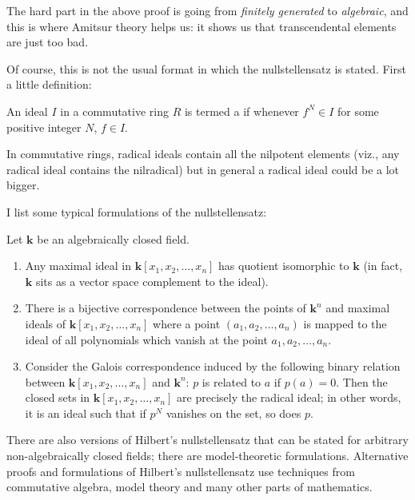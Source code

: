 \documentclass[a4paper]{amsart}
\newcommand{\field}{\mathbf{k}}
\begin{document}
The hard part in the above proof is going from {\em finitely
  generated} to {\em algebraic}, and this is where Amitsur theory
helps us: it shows us that transcendental elements are just too bad.

Of course, this is not the usual format in which the nullstellensatz
is stated. First a little definition:

\begin{definer}
  An ideal $I$ in a commutative ring $R$ is termed a
   if whenever $f^N \in I$ for some
  positive integer $N$, $f \in I$.
\end{definer}

In commutative rings, radical ideals contain all the nilpotent
elements (viz., any radical ideal contains the nilradical) but in
general a radical ideal could be a lot bigger.

I list some typical formulations of the nullstellensatz:

\begin{theorem}
  Let $\field$ be an algebraically closed field.

  \begin{enumerate}

  \item Any maximal ideal in $\field[x_1,x_2,\ldots,x_n]$ has quotient
    isomorphic to $\field$ (in fact, $\field$ sits as a vector space
    complement to the ideal).

  \item There is a bijective correspondence between the points of
    $\field^n$ and maximal ideals of $\field[x_1,x_2,\ldots,x_n]$
    where a point $(a_1,a_2,\ldots,a_n)$ is mapped to the ideal of all
    polynomials which vanish at the point $a_1, a_2, \ldots, a_n$.

  \item Consider the Galois correspondence induced by the following
    binary relation between $\field[x_1, x_2, \ldots, x_n]$ and
    $\field^n$: $p$ is related to $a$ if $p(a) = 0$. Then the closed
    sets in $\field[x_1,x_2,\ldots,x_n]$ are precisely the radical
    ideal; in other words, it is an ideal such that if $p^N$ vanishes
    on the set, so does $p$.

  \end{enumerate}
\end{theorem}

There are also versions of Hilbert's nullstellensatz that can be
stated for arbitrary non-algebraically closed fields; there are
model-theoretic formulations. Alternative proofs and formulations of
Hilbert's nullstellensatz use techniques from commutative algebra,
model theory and many other parts of mathematics.
\end{document}
